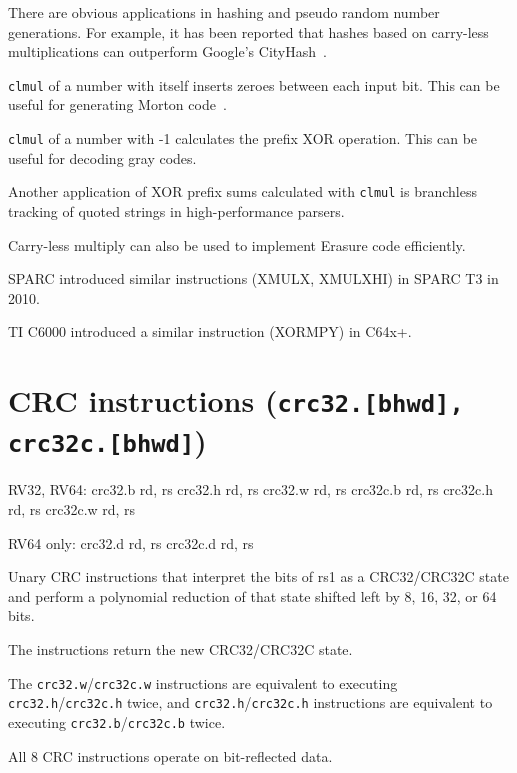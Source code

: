 There are obvious applications in hashing and pseudo random number generations. For
example, it has been reported that hashes based on carry-less multiplications can
outperform Google's CityHash~\cite{CLHASH}.

\texttt{clmul} of a number with itself inserts zeroes between each input bit. This can
be useful for generating Morton code~\cite{MortonCode}.

\texttt{clmul} of a number with -1 calculates the prefix XOR operation. This can
be useful for decoding gray codes.

Another application of XOR prefix sums calculated with \texttt{clmul} is
branchless tracking of quoted strings in high-performance parsers.~\cite{ParseJSON}

Carry-less multiply can also be used to implement Erasure code efficiently.~\cite{ClmulErasureCode}

SPARC introduced similar instructions (XMULX, XMULXHI) in SPARC T3 in 2010.~\cite{sparct3}

TI C6000 introduced a similar instruction (XORMPY) in C64x+.~\cite{c64xp}


\section{CRC instructions (\texttt{crc32.[bhwd], crc32c.[bhwd]})}

\begin{rvb}
  RV32, RV64:
    crc32.b rd, rs
    crc32.h rd, rs
    crc32.w rd, rs
    crc32c.b rd, rs
    crc32c.h rd, rs
    crc32c.w rd, rs

  RV64 only:
    crc32.d rd, rs
    crc32c.d rd, rs
\end{rvb}

Unary CRC instructions that interpret the bits of rs1 as a CRC32/CRC32C state
and perform a polynomial reduction of that state shifted left by 8, 16, 32, or
64 bits.

The instructions return the new CRC32/CRC32C state.

The \texttt{crc32.w}/\texttt{crc32c.w} instructions are equivalent to executing
\texttt{crc32.h}/\texttt{crc32c.h} twice, and \texttt{crc32.h}/\texttt{crc32c.h}
instructions are equivalent to executing \texttt{crc32.b}/\texttt{crc32c.b}
twice.

All 8 CRC instructions operate on bit-reflected data.

